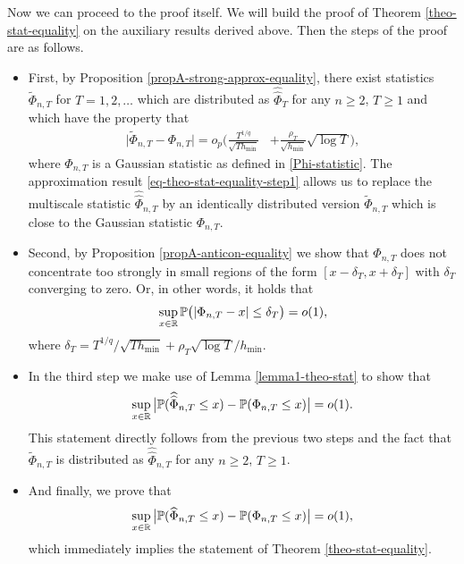 \documentclass[a4paper,12pt]{article}
\newcommand{\doublehattwo}[1]{\widehat{\widehat{#1}}}
\begin{document}
Now we can proceed to the proof itself. We will build the proof of Theorem \ref{theo-stat-equality} on the auxiliary results derived above. Then the steps of the proof are as follows.
\begin{itemize}
\item First, by Proposition \ref{propA-strong-approx-equality}, there exist statistics $\widetilde{\Phi}_{n, T}$ for $T = 1,2,\ldots$ which are distributed as $\doublehattwo{\Phi}_T$ for any $n \ge 2$, $T \ge 1$ and which have the property that 
\begin{align}\label{eq-theo-stat-equality-step1}
\big| \widetilde{\Phi}_{n, T} - \Phi_{n,T} \big| = o_p \Big( \frac{T^{1/q}}{\sqrt{T h_{\min}}} &+ \frac{\rho_T}{\sqrt{h_{\min}}}\sqrt{\log T} \Big),
\end{align}
where $\Phi_{n, T}$ is a Gaussian statistic as defined in \eqref{Phi-statistic}. The approximation result \eqref{eq-theo-stat-equality-step1} allows us to replace the multiscale statistic $\doublehattwo{\Phi}_{n, T}$ by an identically distributed version $\widetilde{\Phi}_{n, T}$ which is close to the Gaussian statistic $\Phi_{n, T}$.
\item Second, by Proposition \ref{propA-anticon-equality} we show that $\Phi_{n,T}$ does not concentrate too strongly in small regions of the form $[x-\delta_T,x+\delta_T]$ with $\delta_T$ converging to zero. Or, in other words, it holds that 
\begin{align}\label{eq-theo-stat-equality-step2}
\sup_{x \in \mathbb{R}} \mathbb{P} \big( | \Phi_{n,T} - x | \le \delta_T \big) = o(1),
\end{align}
where $\delta_T = T^{1/q} / \sqrt{T h_{\min}} + \rho_T \sqrt{\log T}/ h_{\min}$.
\item In the third step we make use of Lemma \ref{lemma1-theo-stat} to show that
\begin{equation}\label{eq-theo-stat-equality-step3}
\sup_{x \in \reals} \big| \pr(\doublehattwo{\Phi}_{n, T} \le x) - \pr(\Phi_{n,T} \le x) \big| = o(1). 
\end{equation}
This statement directly follows from the previous two steps and the fact that $\widetilde{\Phi}_{n, T}$ is distributed as $\doublehattwo{\Phi}_{n, T}$ for any $n \ge 2$, $T \ge 1$.
\item And finally, we prove that  
\begin{equation}\label{eq-theo-stat-equality-step4}
\sup_{x \in \mathbb{R}} \big| \mathbb{P}(\widehat{\Phi}_{n, T} \le x) - \mathbb{P}(\Phi_{n,T} \le x) \big| = o(1),
\end{equation}
which immediately implies the statement of Theorem \ref{theo-stat-equality}.
\end{itemize}
\end{document}
